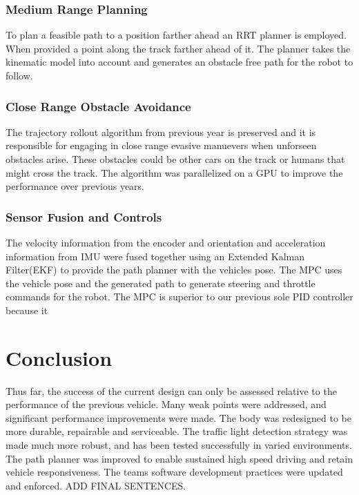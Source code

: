 \documentclass[11pt,journal]{IEEEtran}
\begin{document}
\subsubsection{Medium Range Planning}
To plan a feasible path to a position farther ahead an RRT planner is employed. When provided a point along the track farther ahead of it. The planner takes the kinematic model into account and generates an obstacle free path for the robot to follow.

\subsubsection{Close Range Obstacle Avoidance}
The trajectory rollout algorithm from previous year is preserved and it is responsible for engaging in close range evasive manuevers when unforseen obstacles arise. These obstacles could be other cars on the track or humans that might cross the track. The algorithm was parallelized on a GPU to improve the performance over previous years.

\subsubsection{Sensor Fusion and Controls}
The velocity information from the encoder and orientation and acceleration information from IMU were fused together using an Extended Kalman Filter(EKF) to provide the path planner with the vehicles pose. The MPC uses the vehicle pose and the generated path to generate steering and throttle commands for the robot. The MPC is superior to our previous sole PID controller because it 

\section{Conclusion}
Thus far, the success of the current design can only be assessed relative to the performance of the previous vehicle. Many weak points were addressed, and significant performance improvements were made. The body was redesigned to be more durable, repairable  and serviceable. The traffic light detection strategy was made much more robust, and has been tested successfully in varied environments. The path planner was improved to enable sustained high speed driving and retain vehicle responsiveness. The teams software development practices were updated and enforced. ADD FINAL SENTENCES.



\end{document}

